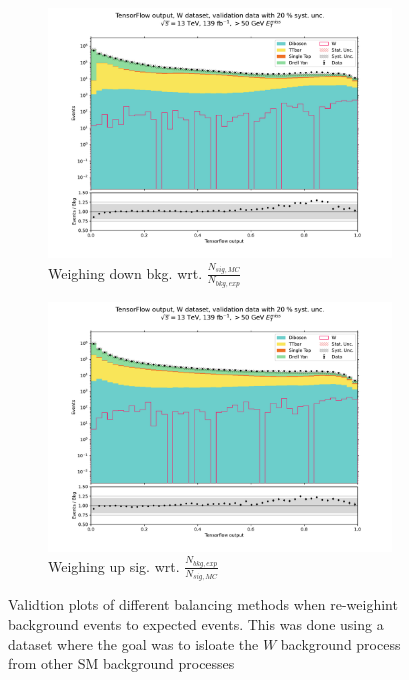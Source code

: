 \documentclass[12pt, a4paper]{book}
\begin{document}
\begin{figure}[!ht]
\begin{subfigure}[b]{0.49\textwidth}
          \includegraphics[width=1\textwidth]{bkg_exp/VAL.pdf}
          \caption{Weighing down bkg. wrt. $\frac{N_{sig,MC}}{N_{bkg,exp}}$ }
       \end{subfigure}
       \hfill
       \begin{subfigure}[b]{0.49\textwidth}
          \centering
          \includegraphics[width=1\textwidth]{sig_exp/VAL.pdf}
          \caption{Weighing up sig. wrt. $\frac{N_{bkg,exp}}{N_{sig,MC}}$}
       \end{subfigure}
     \caption[Validation plots for re-weighting background to expected events on NNs]{Validtion plots of different balancing methods when re-weighint background events to expected events. 
     This was done using a dataset where the goal was to isloate the $W$ background process from other SM background processes} \label{fig:WVAL_rw}
\end{figure}
\end{document}
